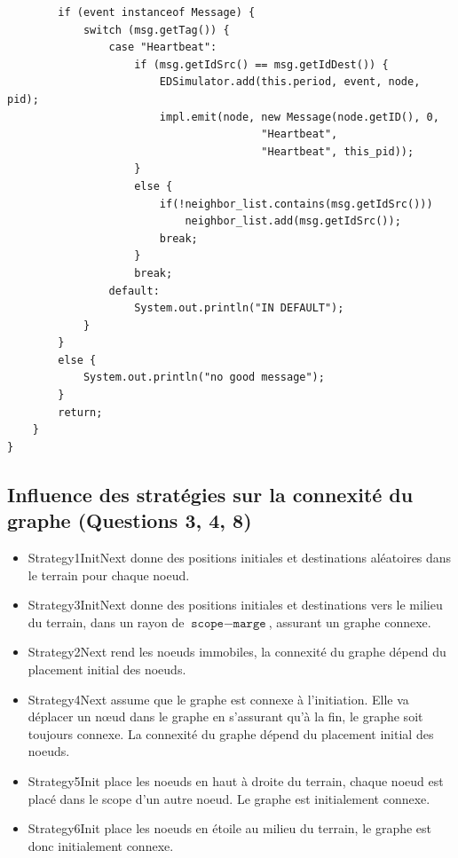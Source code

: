\documentclass[a4paper]{article}
\begin{document}
\begin{verbatim}
        if (event instanceof Message) {
            switch (msg.getTag()) {
                case "Heartbeat":
                    if (msg.getIdSrc() == msg.getIdDest()) {
                        EDSimulator.add(this.period, event, node, pid);
                        impl.emit(node, new Message(node.getID(), 0,
                                        "Heartbeat",
                                        "Heartbeat", this_pid));
                    }
                    else {
                        if(!neighbor_list.contains(msg.getIdSrc()))
                            neighbor_list.add(msg.getIdSrc());
                        break;
                    }
                    break;
                default:
                    System.out.println("IN DEFAULT");
            }
        }
        else {
            System.out.println("no good message");
        }
        return;
    }
}
\end{verbatim}

\subsection{Influence des stratégies sur la connexité du graphe (Questions 3, 4, 8)}

\begin{itemize}
  \item Strategy1InitNext donne des positions initiales et destinations
aléatoires dans le terrain pour chaque noeud.
  \item Strategy3InitNext donne des positions initiales et
    destinations vers le milieu du terrain, dans un rayon de $ \texttt{scope} -
\texttt{marge} $, assurant un graphe
    connexe.
    \item Strategy2Next rend les noeuds immobiles, la connexité du
      graphe dépend du placement initial des noeuds.
  \item Strategy4Next assume que le graphe est connexe à
    l'initiation. Elle va déplacer un nœud dans le graphe en
    s'assurant qu'à la fin, le graphe soit toujours connexe. La
    connexité du graphe dépend du placement initial des noeuds.
    \item Strategy5Init place les noeuds en haut à droite du terrain,
      chaque noeud est placé dans le scope d'un autre noeud.
      Le graphe est initialement connexe.
      \item Strategy6Init place les noeuds en étoile au milieu du
        terrain, le graphe est donc initialement connexe.
\end{itemize}
\end{document}
